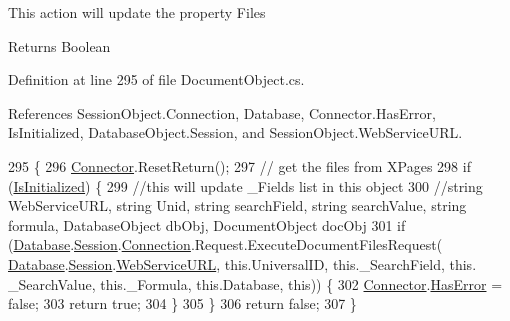 This action will update the property \textquotesingle{}Files\textquotesingle{}

\begin{DoxyReturn}{Returns}
Boolean
\end{DoxyReturn}


Definition at line 295 of file Document\+Object.\+cs.



References Session\+Object.\+Connection, Database, Connector.\+Has\+Error, Is\+Initialized, Database\+Object.\+Session, and Session\+Object.\+Web\+Service\+U\+RL.


\begin{DoxyCode}
295                            \{
296         \mbox{\hyperlink{class_connector}{Connector}}.ResetReturn();
297         \textcolor{comment}{// get the files from XPages}
298         \textcolor{keywordflow}{if} (\mbox{\hyperlink{class_document_object_a3b2075b73f38d05091b69decc6ce7992}{IsInitialized}}) \{
299             \textcolor{comment}{//this will update \_Fields list in this object}
300             \textcolor{comment}{//string WebServiceURL, string Unid, string searchField, string searchValue, string formula,
       DatabaseObject dbObj, DocumentObject docObj}
301             \textcolor{keywordflow}{if} (\mbox{\hyperlink{class_document_object_a69d5338c9835f748490323d2950eed09}{Database}}.\mbox{\hyperlink{class_database_object_aa8484162b7d2a7c4c9426bca13c64c07}{Session}}.\mbox{\hyperlink{class_session_object_a014bdbf705a753540e19bfb53030c55c}{Connection}}.Request.ExecuteDocumentFilesRequest(
      \mbox{\hyperlink{class_document_object_a69d5338c9835f748490323d2950eed09}{Database}}.\mbox{\hyperlink{class_database_object_aa8484162b7d2a7c4c9426bca13c64c07}{Session}}.\mbox{\hyperlink{class_session_object_a697c071c812fbf7ad1166b896fb44c16}{WebServiceURL}}, \textcolor{keyword}{this}.UniversalID, \textcolor{keyword}{this}.\_SearchField, \textcolor{keyword}{this}.
      \_SearchValue, \textcolor{keyword}{this}.\_Formula, \textcolor{keyword}{this}.Database, \textcolor{keyword}{this})) \{
302                 \mbox{\hyperlink{class_connector}{Connector}}.\mbox{\hyperlink{class_connector_a9365777a6b7b711b75bcfa6c4d53e989}{HasError}} = \textcolor{keyword}{false};
303                 \textcolor{keywordflow}{return} \textcolor{keyword}{true};
304             \}
305         \}
306         \textcolor{keywordflow}{return} \textcolor{keyword}{false};
307     \}
\end{DoxyCode}
\mbox{\label{class_document_object_af4298d6cfbb9ea60643d9995309b73f1}} 
